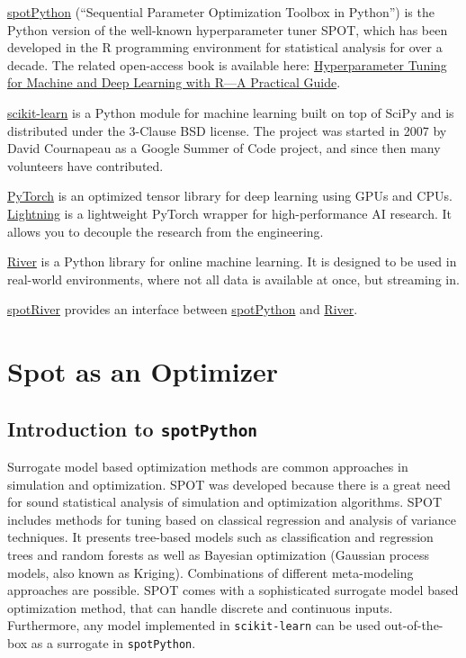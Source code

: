 \documentclass[
  letterpaper,
  DIV=11,
  numbers=noendperiod]{scrreprt}
\begin{document}

\href{https://github.com/sequential-parameter-optimization/spotPython}{spotPython}
(``Sequential Parameter Optimization Toolbox in Python'') is the Python
version of the well-known hyperparameter tuner SPOT, which has been
developed in the R programming environment for statistical analysis for
over a decade. The related open-access book is available here:
\href{https://link.springer.com/book/10.1007/978-981-19-5170-1}{Hyperparameter
Tuning for Machine and Deep Learning with R---A Practical Guide}.

\href{https://scikit-learn.org}{scikit-learn} is a Python module for
machine learning built on top of SciPy and is distributed under the
3-Clause BSD license. The project was started in 2007 by David
Cournapeau as a Google Summer of Code project, and since then many
volunteers have contributed.

\href{https://pytorch.org}{PyTorch} is an optimized tensor library for
deep learning using GPUs and CPUs.
\href{https://lightning.ai/docs/pytorch/latest/}{Lightning} is a
lightweight PyTorch wrapper for high-performance AI research. It allows
you to decouple the research from the engineering.

\href{https://riverml.xyz}{River} is a Python library for online machine
learning. It is designed to be used in real-world environments, where
not all data is available at once, but streaming in.

\href{https://github.com/sequential-parameter-optimization/spotRiver}{spotRiver}
provides an interface between
\href{https://github.com/sequential-parameter-optimization/spotPython}{spotPython}
and \href{https://riverml.xyz}{River}.

\part{Spot as an Optimizer}

\hypertarget{sec-spot}{%
\chapter{\texorpdfstring{Introduction to
\texttt{spotPython}}{Introduction to spotPython}}\label{sec-spot}}

Surrogate model based optimization methods are common approaches in
simulation and optimization. SPOT was developed because there is a great
need for sound statistical analysis of simulation and optimization
algorithms. SPOT includes methods for tuning based on classical
regression and analysis of variance techniques. It presents tree-based
models such as classification and regression trees and random forests as
well as Bayesian optimization (Gaussian process models, also known as
Kriging). Combinations of different meta-modeling approaches are
possible. SPOT comes with a sophisticated surrogate model based
optimization method, that can handle discrete and continuous inputs.
Furthermore, any model implemented in \texttt{scikit-learn} can be used
out-of-the-box as a surrogate in \texttt{spotPython}.
\end{document}
